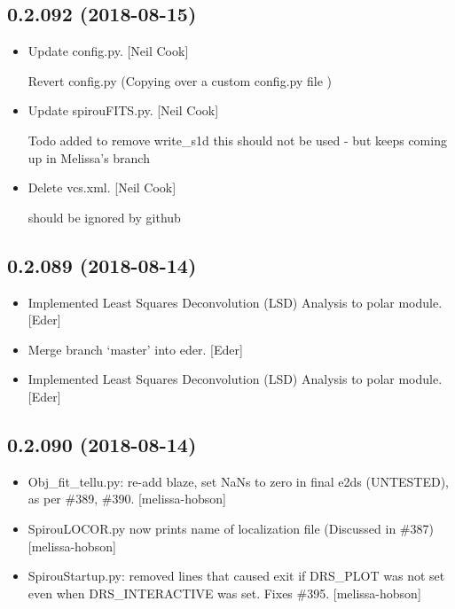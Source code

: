 \documentclass[a4paper,10pt,english]{report}
\begin{document}
\subsection{0.2.092 (2018-08-15)}
\label{\detokenize{misc/changelog:id368}}\begin{itemize}
\item {} 
Update config.py. {[}Neil Cook{]}

Revert config.py (Copying over a custom config.py file )

\item {} 
Update spirouFITS.py. {[}Neil Cook{]}

Todo added to remove write\_s1d this should not be used - but keeps coming up in Melissa’s branch

\item {} 
Delete vcs.xml. {[}Neil Cook{]}

should be ignored by github

\end{itemize}


\subsection{0.2.089 (2018-08-14)}
\label{\detokenize{misc/changelog:id369}}\begin{itemize}
\item {} 
Implemented Least Squares Deconvolution (LSD) Analysis to polar
module. {[}Eder{]}

\item {} 
Merge branch ‘master’ into eder. {[}Eder{]}

\item {} 
Implemented Least Squares Deconvolution (LSD) Analysis to polar
module. {[}Eder{]}

\end{itemize}


\subsection{0.2.090 (2018-08-14)}
\label{\detokenize{misc/changelog:id370}}\begin{itemize}
\item {} 
Obj\_fit\_tellu.py: re-add blaze, set NaNs to zero in final e2ds
(UNTESTED), as per \#389, \#390. {[}melissa-hobson{]}

\item {} 
SpirouLOCOR.py now prints name of localization file (Discussed in
\#387) {[}melissa-hobson{]}

\item {} 
SpirouStartup.py: removed lines that caused exit if DRS\_PLOT was not
set even when DRS\_INTERACTIVE was set. Fixes \#395. {[}melissa-hobson{]}

\end{itemize}
\end{document}
